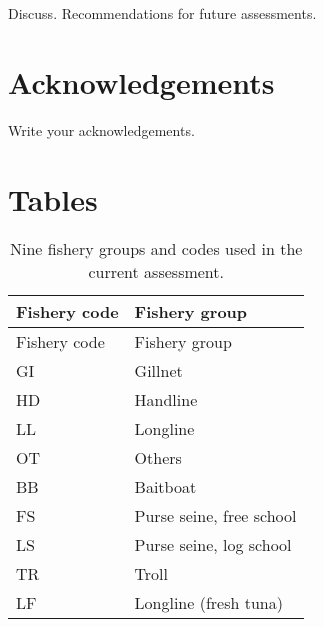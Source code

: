\documentclass[
]{scrartcl}
\begin{document}
Discuss. Recommendations for future assessments.

\section{Acknowledgements}\label{acknowledgements}

Write your acknowledgements.

\newpage{}

\section{Tables}\label{tables}

\begin{longtable}[]{@{}ll@{}}
\caption{Nine fishery groups and codes used in the current
assessment.}\label{tbl-fishery-codes}\tabularnewline
\toprule\noalign{}
Fishery code & Fishery group \\
\midrule\noalign{}
\endfirsthead
\toprule\noalign{}
Fishery code & Fishery group \\
\midrule\noalign{}
\endhead
\bottomrule\noalign{}
\endlastfoot
GI & Gillnet \\
HD & Handline \\
LL & Longline \\
OT & Others \\
BB & Baitboat \\
FS & Purse seine, free school \\
LS & Purse seine, log school \\
TR & Troll \\
LF & Longline (fresh tuna) \\
\end{longtable}

\newpage{}
\end{document}
